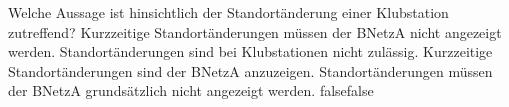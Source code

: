     {Welche Aussage ist hinsichtlich der Standortänderung einer Klubstation zutreffend?}
    {Kurzzeitige Standortänderungen müssen der BNetzA nicht angezeigt werden.}
    {Standortänderungen sind bei Klubstationen nicht zulässig.}
    {Kurzzeitige Standortänderungen sind der BNetzA anzuzeigen.}
    {Standortänderungen müssen der BNetzA grundsätzlich nicht angezeigt werden.}
    {false}{false}